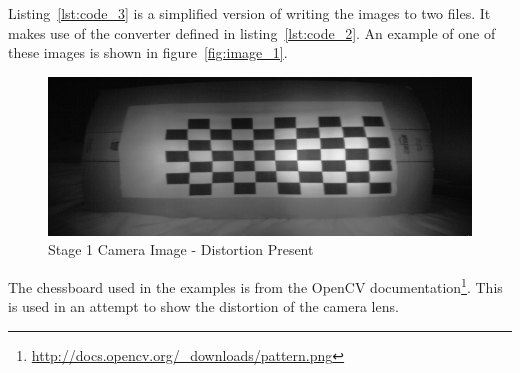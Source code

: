 \documentclass[11pt,oneside]{report}
\newcommand\code[1]{\texttt{#1}}
\begin{document}
		Listing~\ref{lst:code_3} is a simplified version of writing the images to two files.
		It makes use of the converter defined in listing~\ref{lst:code_2}.
		An example of one of these images is shown in figure~\ref{fig:image_1}. %
		\begin{figure}
			\centering
    				\includegraphics[width=\textwidth]{1}
    				\caption{Stage 1 Camera Image - Distortion Present \protect {\label{fig:image_1}}}

		\end{figure}	
		The chessboard used in the examples is from the OpenCV documentation\footnote{\url{http://docs.opencv.org/_downloads/pattern.png}}.
		This is used in an attempt to show the distortion of the camera lens.
			
			
\end{document}
